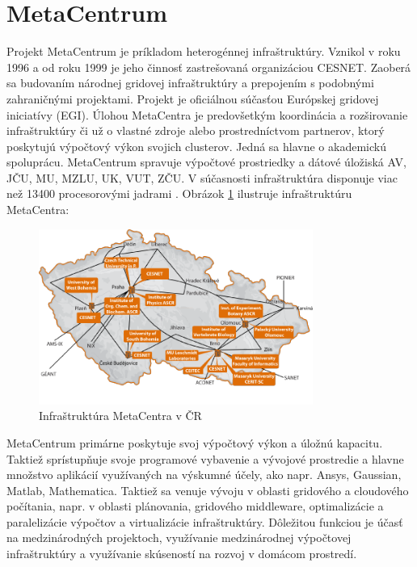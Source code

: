 \documentclass[printed,11pt,twoside,color,cover,table]{fithesis3}
\begin{document}
\section{MetaCentrum}
Projekt MetaCentrum je príkladom heterogénnej infraštruktúry. Vznikol v roku 1996 a od roku 1999 je jeho činnosť zastrešovaná organizáciou CESNET. Zaoberá sa budovaním národnej gridovej infraštruktúry a 
prepojením s podobnými zahraničnými projektami. Projekt je oficiálnou súčasťou Európskej gridovej iniciatívy (EGI). Úlohou MetaCentra je predovšetkým koordinácia a rozširovanie infraštruktúry či už o vlastné zdroje alebo prostredníctvom
partnerov, ktorý poskytujú výpočtový výkon svojich clusterov. Jedná sa hlavne o akademickú spoluprácu. MetaCentrum spravuje výpočtové prostriedky a dátové úložiská AV, JČU, MU, MZLU, UK, VUT, ZČU.
V súčasnosti infraštruktúra disponuje viac než 13400 procesorovými jadrami \cite{metacentrum_size}. Obrázok \ref{fig:metacentrum_cr} ilustruje infraštruktúru MetaCentra:
\begin{figure}[h]
\begin{center}
       \includegraphics[width=0.8\textwidth]{images/metacentrum.png}
       \caption{Infraštruktúra MetaCentra v ČR}
       \label{fig:metacentrum_cr}
\end{center}
\end{figure}
MetaCentrum primárne poskytuje svoj výpočtový výkon a úložnú kapacitu. Taktiež sprístupňuje svoje programové vybavenie a vývojové prostredie a hlavne množstvo aplikácií využívaných na výskumné účely, ako napr. 
Ansys, Gaussian, Matlab, Mathematica. Taktiež sa venuje vývoju v oblasti gridového a cloudového počítania, napr. v oblasti plánovania, gridového middleware, optimalizácie a paralelizácie výpočtov a virtualizácie
infraštruktúry. Dôležitou funkciou je účasť na medzinárodných projektoch, využívanie medzinárodnej výpočtovej infraštruktúry a využívanie skúseností na rozvoj v domácom prostredí.\cite{metacentrum}
\end{document}
